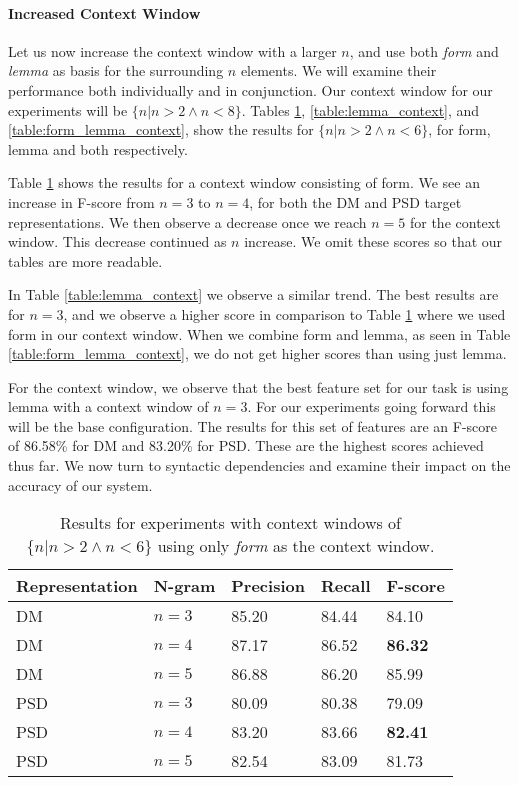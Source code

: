\paragraph{Increased Context Window} Let us now increase the context window with a larger $n$, and use both \textit{form} and \textit{lemma} as basis for the surrounding $n$ elements. We will examine their performance both individually and in conjunction. Our context window for our experiments will be ${\{n|n>2 \wedge n<8\}}$. Tables \ref{table:form_context}, \ref{table:lemma_context}, and \ref{table:form_lemma_context}, show the results for ${\{n|n>2 \wedge n<6\}}$, for form, lemma and both respectively. 

Table \ref{table:form_context} shows the results for a context window consisting of form. We see an increase in F-score from $n=3$ to $n=4$, for both the DM and PSD target representations. We then observe a decrease once we reach $n=5$ for the context window. This decrease continued as $n$ increase. We omit these scores so that our tables are more readable.

In Table \ref{table:lemma_context} we observe a similar trend. The best results are for $n=3$, and we observe a higher score in comparison to Table \ref{table:form_context} where we used form in our context window. When we combine form and lemma, as seen in Table \ref{table:form_lemma_context}, we do not get higher scores than using just lemma.

For the context window, we observe that the best feature set for our task is using lemma with a context window of $n=3$. For our experiments going forward this will be the base configuration. The results for this set of features are an F-score of 86.58\% for DM and 83.20\% for PSD. These are the highest scores achieved thus far. We now turn to syntactic dependencies and examine their impact on the accuracy of our system.

\begin{table}
    \centering
    \smaller[0.2]
    \begin{tabular}{@{}lllll@{}}
        \toprule
        \textbf{Representation} & \textbf{N-gram} & \textbf{Precision} & \textbf{Recall} & \textbf{F-score} \\
        \midrule
        DM & $n=3$ & 85.20 & 84.44 & 84.10 \\
        DM & $n=4$  & 87.17 & 86.52 & \textbf{86.32} \\
        DM & $n=5$  & 86.88 & 86.20 & 85.99 \\
        \midrule
        PSD & $n=3$ & 80.09 & 80.38 & 79.09 \\
        PSD & $n=4$ & 83.20 & 83.66 & \textbf{82.41} \\
        PSD & $n=5$ & 82.54 & 83.09 & 81.73 \\
        \bottomrule
    \end{tabular}
    \caption{Results for experiments with context windows of ${\{n|n>2 \wedge n<6\}}$ using only \textit{form} as the context window.}
    \label{table:form_context}
\end{table}

